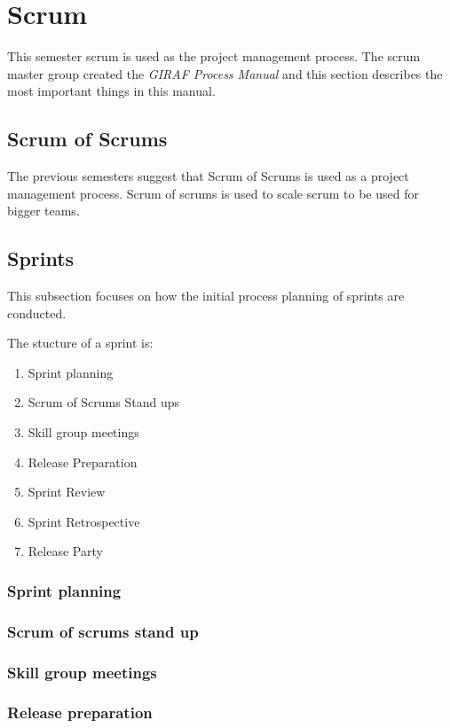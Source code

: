\section{Scrum}
This semester scrum is used as the project management process. 
The scrum master group created the \textit{GIRAF Process Manual} and this section describes the most important things in this manual.


\subsection{Scrum of Scrums}
The previous semesters suggest that Scrum of Scrums is used as a project management process. 
Scrum of scrums is used to scale scrum to be used for bigger teams.

\subsection{Sprints}
This subsection focuses on how the initial process planning of sprints are conducted. 

The stucture of a sprint is:
\begin{enumerate}
    \item Sprint planning
    \item Scrum of Scrums Stand ups
    \item Skill group meetings
    \item Release Preparation
    \item Sprint Review
    \item Sprint Retrospective
    \item Release Party
\end{enumerate}

\subsubsection{Sprint planning}
\subsubsection{Scrum of scrums stand up}
\subsubsection{Skill group meetings}
\subsubsection{Release preparation}
